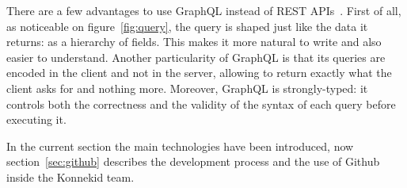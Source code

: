 There are a few advantages to use GraphQL instead of REST APIs~\cite{graphQL}. First of all, as noticeable on {\sc figure}~\ref{fig:query}, the query is shaped just like the data it returns: as a hierarchy of fields. This makes it more natural to write and also easier to understand. Another particularity of GraphQL is that its queries are encoded in the client and not in the server, allowing to return exactly what the client asks for and nothing more. Moreover, GraphQL is strongly-typed: it controls both the correctness and the validity of the syntax of each query before executing it.

In the current section the main technologies have been introduced, now {\sc section}~\ref{sec:github} describes the development process and the use of Github inside the Konnekid team.
